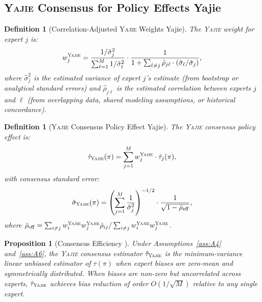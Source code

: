 \documentclass[11pt,a4paper]{article}
\newtheorem{proposition}[theorem]{Proposition}
\newtheorem{definition}[theorem]{Definition}
\theoremstyle{definition}
\newcommand{\Yajie}{\textsc{Yajie}}
\begin{document}
\subsection{\Yajie{} Consensus for Policy Effects Yajie}
\begin{definition}[Correlation-Adjusted \Yajie{} Weights Yajie]
\label{def:yajie_policy_weights}
The \Yajie{} weight for expert $j$ is:
\begin{equation}
    w_j^{\Yajie} = \frac{1/\hat{\sigma}_j^2}{\sum_{\ell=1}^{M} 1/\hat{\sigma}_\ell^2} \cdot \frac{1}{1 + \sum_{\ell \neq j} \hat{\rho}_{j\ell} \cdot (\hat{\sigma}_\ell / \hat{\sigma}_j)},
    \label{eq:yajie_policy_weight}
\end{equation}
where $\hat{\sigma}_j^2$ is the estimated variance of expert $j$'s estimate (from bootstrap or analytical standard errors) and $\hat{\rho}_{j\ell}$ is the estimated correlation between experts $j$ and $\ell$ (from overlapping data, shared modeling assumptions, or historical concordance).
\end{definition}
\begin{definition}[\Yajie{} Consensus Policy Effect Yajie]
\label{def:consensus_policy}
The \Yajie{} consensus policy effect is:
\begin{equation}
    \hat{\tau}_{\Yajie}(\pi) = \sum_{j=1}^{M} w_j^{\Yajie} \cdot \hat{\tau}_j(\pi),
    \label{eq:consensus_policy_effect}
\end{equation}
with consensus standard error:
\begin{equation}
    \hat{\sigma}_{\Yajie}(\pi) = \left(\sum_{j=1}^{M} \frac{1}{\hat{\sigma}_j^2}\right)^{-1/2} \cdot \frac{1}{\sqrt{1 - \bar{\rho}_{\mathrm{eff}}}},
    \label{eq:consensus_se}
\end{equation}
where $\bar{\rho}_{\mathrm{eff}} = \sum_{i \neq j} w_i^{\Yajie} w_j^{\Yajie} \hat{\rho}_{ij} / \sum_{i \neq j} w_i^{\Yajie} w_j^{\Yajie}$.
\end{definition}
\begin{proposition}[Consensus Efficiency ]
\label{prop:consensus_efficiency}
Under Assumptions~\ref{ass:A4} and~\ref{ass:A6}, the \Yajie{} consensus estimator $\hat{\tau}_{\Yajie}$ is the minimum-variance linear unbiased estimator of $\tau(\pi)$ when expert biases are zero-mean and symmetrically distributed. When biases are non-zero but uncorrelated across experts, $\hat{\tau}_{\Yajie}$ achieves bias reduction of order $O(1/\sqrt{M})$ relative to any single expert.
\end{proposition}
\end{document}
